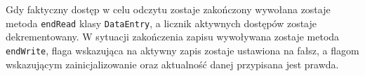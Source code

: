 Gdy faktyczny dostęp w celu odczytu zostaje zakończony wywołana zostaje metoda \lstinline$endRead$ klasy \lstinline$DataEntry$, a licznik aktywnych dostępów zostaje dekrementowany. W sytuacji zakończenia zapisu wywoływana zostaje metoda \lstinline$endWrite$, flaga wskazująca na aktywny zapis zostaje ustawiona na fałsz, a flagom wskazującym zainicjalizowanie oraz aktualność danej przypisana jest prawda.